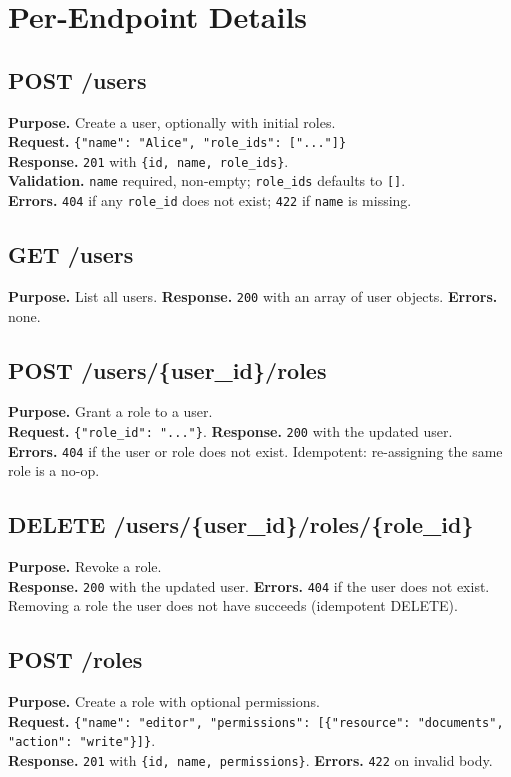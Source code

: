 \documentclass[11pt,a4paper]{report}
\begin{document}
\section{Per-Endpoint Details}

\subsection*{POST /users}
\textbf{Purpose.} Create a user, optionally with initial roles.\\
\textbf{Request.} \texttt{\{"name": "Alice", "role\_ids": ["..."]\}}\\
\textbf{Response.} \texttt{201} with \texttt{\{id, name, role\_ids\}}.\\
\textbf{Validation.} \texttt{name} required, non-empty; \texttt{role\_ids}
defaults to \texttt{[]}.\\
\textbf{Errors.} \texttt{404} if any \texttt{role\_id} does not exist;
\texttt{422} if \texttt{name} is missing.

\subsection*{GET /users}
\textbf{Purpose.} List all users. \textbf{Response.} \texttt{200} with an array
of user objects. \textbf{Errors.} none.

\subsection*{POST /users/\{user\_id\}/roles}
\textbf{Purpose.} Grant a role to a user.\\
\textbf{Request.} \texttt{\{"role\_id": "..."\}}. \textbf{Response.} \texttt{200}
with the updated user.\\
\textbf{Errors.} \texttt{404} if the user or role does not exist. Idempotent:
re-assigning the same role is a no-op.

\subsection*{DELETE /users/\{user\_id\}/roles/\{role\_id\}}
\textbf{Purpose.} Revoke a role.\\
\textbf{Response.} \texttt{200} with the updated user. \textbf{Errors.}
\texttt{404} if the user does not exist. Removing a role the user does not have
succeeds (idempotent DELETE).

\subsection*{POST /roles}
\textbf{Purpose.} Create a role with optional permissions.\\
\textbf{Request.} \texttt{\{"name": "editor", "permissions": [\{"resource":
"documents", "action": "write"\}]\}}.\\
\textbf{Response.} \texttt{201} with \texttt{\{id, name, permissions\}}.
\textbf{Errors.} \texttt{422} on invalid body.
\end{document}
